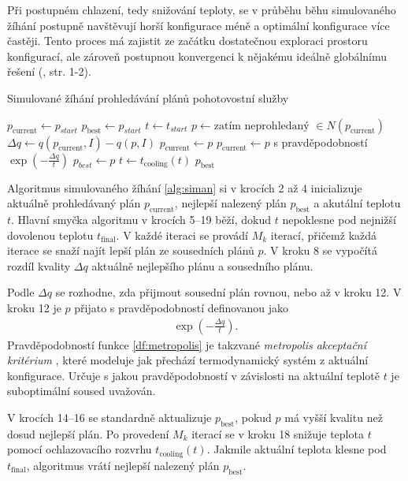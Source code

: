 Při postupném chlazení, tedy snižování teploty, se v průběhu běhu simulovaného žíhání postupně navštěvují horší konfigurace méně a optimální konfigurace více častěji.
Tento proces má zajistit ze začátku dostatečnou exploraci prostoru konfigurací, ale zároveň postupnou konvergenci k nějakému ideálně globálnímu řešení (\citet{GlovKoch03}, str. 1-2).

\begin{algorithm}[H]
  \caption{Simulované žíhání prohledávání plánů pohotovostní služby}
  \begin{algorithmic}[1]
    \State $p_{\text{current}} \gets p_{start}$
    \State $p_{\text{best}} \gets p_{start}$
    \State $t \gets t_{start}$
        \State $p \gets \text{zatím neprohledaný } \in N(p_{\text{current}})$
        \State $\Delta q \gets q(p_{\text{current}}, I) - q(p, I)$
          \State $p_{\text{current}} \gets p$
        \Else
          \State $p_{\text{current}} \gets p$ s pravděpodobností $\exp\left(-\frac{\Delta q}{t}\right)$
        \EndIf
          \State $p_{best} \gets p$
        \EndIf
      \EndFor
      \State $t \gets t_{\text{cooling}}(t)$
    \EndWhile
    \State \Return $p_{\text{best}}$
    \EndFunction
  \end{algorithmic}
  \label{alg:siman}
\end{algorithm}

Algoritmus simulovaného žíhání \ref{alg:siman} si v krocích 2 až 4 inicializuje aktuálně prohledávaný plán $p_{\text{current}}$, nejlepší nalezený plán $p_{\text{best}}$ a akutální teplotu $t$.
Hlavní smyčka algoritmu v krocích 5--19 běží, dokud $t$ nepoklesne pod nejnižší dovolenou teplotu $t_{\text{final}}$.
V každé iteraci se provádí $M_k$ iterací, přičemž každá iterace se snaží najít lepší plán ze sousedních plánů $p$.
V kroku 8 se vypočítá rozdíl kvality $\Delta q$ aktuálně nejlepšího plánu a sousedního plánu.

Podle $\Delta q$ se rozhodne, zda přijmout sousední plán rovnou, nebo až v kroku 12.
V kroku 12 je $p$ přijato s pravděpodobností definovanou jako
\begin{align}\label{df:metropolis}
  \exp\left(-\frac{\Delta q}{t}\right).
\end{align}
Pravděpodobností funkce \ref{df:metropolis} je takzvané \textit{metropolis akceptační kritérium} \cite{Metropolis}, které modeluje
jak přechází termodynamický systém z aktuální konfigurace.
Určuje s jakou pravděpodobností v závislosti na aktuální teplotě $t$ je suboptimální soused uvažován.

V krocích 14--16 se standardně aktualizuje $p_{\text{best}}$, pokud $p$ má vyšší kvalitu než dosud nejlepší plán.
Po provedení $M_k$ iterací se v kroku 18 snižuje teplota $t$ pomocí ochlazovacího rozvrhu $t_{\text{cooling}}(t)$.
Jakmile aktuální teplota klesne pod $t_{\text{final}}$, algoritmus vrátí nejlepší nalezený plán $p_{\text{best}}$.

